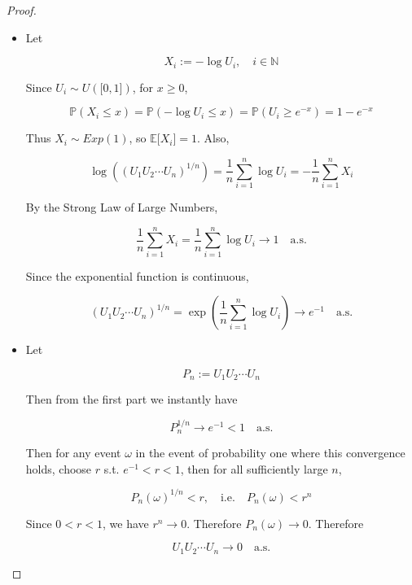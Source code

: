\begin{proof}

\begin{itemize}
\item
  Let

  \[\mathit{X}_{\mathit{i}} := - \log\mathit{U}_{\mathit{i}},\quad\mathit{i} \in \mathbb{N}\]

  Since \(\mathit{U}_{\mathit{i}} \sim \mathit{U}(\lbrack 0,1\rbrack)\), for \(\mathit{x} \geq 0\),

  \[\mathbb{P}(\mathit{X}_{\mathit{i}} \leq \mathit{x}) = \mathbb{P}( - \log\mathit{U}_{\mathit{i}} \leq \mathit{x}) = \mathbb{P}(\mathit{U}_{\mathit{i}} \geq \mathit{e}^{- \mathit{x}}) = 1 - \mathit{e}^{- \mathit{x}}\]

  Thus \(\mathit{X}_{\mathit{i}} \sim Exp(1)\), so \(\mathbb{E}\lbrack\mathit{X}_{\mathit{i}}\rbrack = 1\). Also,

  \[\log\left( {(\mathit{U}_{1}\mathit{U}_{2}\cdots\mathit{U}_{\mathit{n}})^{1/\mathit{n}}} \right) = \frac{1}{\mathit{n}}\sum\limits_{\mathit{i} = 1}^{\mathit{n}}\log\mathit{U}_{\mathit{i}} = - \frac{1}{\mathit{n}}\sum\limits_{\mathit{i} = 1}^{\mathit{n}}\mathit{X}_{\mathit{i}}\]

  By the Strong Law of Large Numbers,

  \[\frac{1}{\mathit{n}}\sum\limits_{\mathit{i} = 1}^{\mathit{n}}\mathit{X}_{\mathit{i}} = \frac{1}{\mathit{n}}\sum\limits_{\mathit{i} = 1}^{\mathit{n}}\log\mathit{U}_{\mathit{i}}\rightarrow 1\quad\text{a.s.}\]

  Since the exponential function is continuous,

  \[(\mathit{U}_{1}\mathit{U}_{2}\cdots\mathit{U}_{\mathit{n}})^{1/\mathit{n}} = \exp\left( {\frac{1}{\mathit{n}}\sum\limits_{\mathit{i} = 1}^{\mathit{n}}\log\mathit{U}_{\mathit{i}}} \right)\rightarrow\mathit{e}^{- 1}\quad\text{a.s.}\]
\item
  Let

  \[\mathit{P}_{\mathit{n}} := \mathit{U}_{1}\mathit{U}_{2}\cdots\mathit{U}_{\mathit{n}}\]

  Then from the first part we instantly have

  \[\mathit{P}_{\mathit{n}}^{1/\mathit{n}}\rightarrow\mathit{e}^{- 1} < 1\quad\text{a.s.}\]

  Then for any event \(\mathit{\omega}\) in the event of probability one where this convergence holds, choose \(\mathit{r}\) s.t. \(\mathit{e}^{- 1} < \mathit{r} < 1\), then for all sufficiently large \(\mathit{n}\),

  \[\mathit{P}_{\mathit{n}}(\mathit{\omega})^{1/\mathit{n}} < \mathit{r},\quad\text{i.e.}\quad\mathit{P}_{\mathit{n}}(\mathit{\omega}) < \mathit{r}^{\mathit{n}}\]

  Since \(0 < \mathit{r} < 1\), we have \(\mathit{r}^{\mathit{n}}\rightarrow 0\). Therefore \(\mathit{P}_{\mathit{n}}(\mathit{\omega})\rightarrow 0\). Therefore

  \[\mathit{U}_{1}\mathit{U}_{2}\cdots\mathit{U}_{\mathit{n}}\rightarrow 0\quad\text{a.s.}\]
\end{itemize}

\end{proof}

